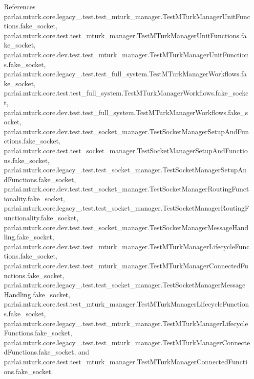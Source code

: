 References parlai.\+mturk.\+core.\+legacy\+\_.\+test.\+test\+\_\+mturk\+\_\+manager.\+Test\+M\+Turk\+Manager\+Unit\+Functions.\+fake\+\_\+socket, parlai.\+mturk.\+core.\+test.\+test\+\_\+mturk\+\_\+manager.\+Test\+M\+Turk\+Manager\+Unit\+Functions.\+fake\+\_\+socket, parlai.\+mturk.\+core.\+dev.\+test.\+test\+\_\+mturk\+\_\+manager.\+Test\+M\+Turk\+Manager\+Unit\+Functions.\+fake\+\_\+socket, parlai.\+mturk.\+core.\+legacy\+\_.\+test.\+test\+\_\+full\+\_\+system.\+Test\+M\+Turk\+Manager\+Workflows.\+fake\+\_\+socket, parlai.\+mturk.\+core.\+test.\+test\+\_\+full\+\_\+system.\+Test\+M\+Turk\+Manager\+Workflows.\+fake\+\_\+socket, parlai.\+mturk.\+core.\+dev.\+test.\+test\+\_\+full\+\_\+system.\+Test\+M\+Turk\+Manager\+Workflows.\+fake\+\_\+socket, parlai.\+mturk.\+core.\+dev.\+test.\+test\+\_\+socket\+\_\+manager.\+Test\+Socket\+Manager\+Setup\+And\+Functions.\+fake\+\_\+socket, parlai.\+mturk.\+core.\+test.\+test\+\_\+socket\+\_\+manager.\+Test\+Socket\+Manager\+Setup\+And\+Functions.\+fake\+\_\+socket, parlai.\+mturk.\+core.\+legacy\+\_.\+test.\+test\+\_\+socket\+\_\+manager.\+Test\+Socket\+Manager\+Setup\+And\+Functions.\+fake\+\_\+socket, parlai.\+mturk.\+core.\+dev.\+test.\+test\+\_\+socket\+\_\+manager.\+Test\+Socket\+Manager\+Routing\+Functionality.\+fake\+\_\+socket, parlai.\+mturk.\+core.\+legacy\+\_.\+test.\+test\+\_\+socket\+\_\+manager.\+Test\+Socket\+Manager\+Routing\+Functionality.\+fake\+\_\+socket, parlai.\+mturk.\+core.\+dev.\+test.\+test\+\_\+socket\+\_\+manager.\+Test\+Socket\+Manager\+Message\+Handling.\+fake\+\_\+socket, parlai.\+mturk.\+core.\+dev.\+test.\+test\+\_\+mturk\+\_\+manager.\+Test\+M\+Turk\+Manager\+Lifecycle\+Functions.\+fake\+\_\+socket, parlai.\+mturk.\+core.\+dev.\+test.\+test\+\_\+mturk\+\_\+manager.\+Test\+M\+Turk\+Manager\+Connected\+Functions.\+fake\+\_\+socket, parlai.\+mturk.\+core.\+legacy\+\_.\+test.\+test\+\_\+socket\+\_\+manager.\+Test\+Socket\+Manager\+Message\+Handling.\+fake\+\_\+socket, parlai.\+mturk.\+core.\+test.\+test\+\_\+mturk\+\_\+manager.\+Test\+M\+Turk\+Manager\+Lifecycle\+Functions.\+fake\+\_\+socket, parlai.\+mturk.\+core.\+legacy\+\_.\+test.\+test\+\_\+mturk\+\_\+manager.\+Test\+M\+Turk\+Manager\+Lifecycle\+Functions.\+fake\+\_\+socket, parlai.\+mturk.\+core.\+legacy\+\_.\+test.\+test\+\_\+mturk\+\_\+manager.\+Test\+M\+Turk\+Manager\+Connected\+Functions.\+fake\+\_\+socket, and parlai.\+mturk.\+core.\+test.\+test\+\_\+mturk\+\_\+manager.\+Test\+M\+Turk\+Manager\+Connected\+Functions.\+fake\+\_\+socket.



